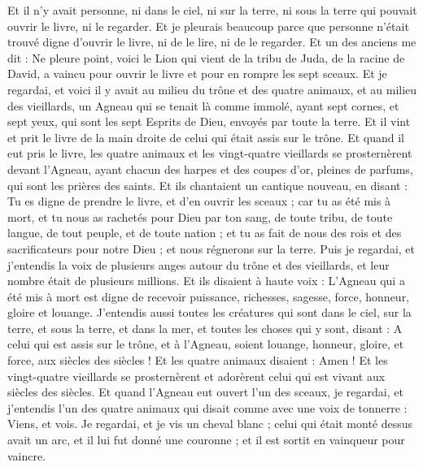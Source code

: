 \begin{multicols}{2}
Et il n'y avait personne, ni dans le ciel, ni sur la terre, ni sous la terre qui pouvait ouvrir le livre, ni le regarder.
Et je pleurais beaucoup parce que personne n'était trouvé digne d'ouvrir le livre, ni de le lire, ni de le regarder.
Et un des anciens me dit : Ne pleure point, voici le Lion qui vient de la tribu de Juda, de la racine de David, a vaincu pour ouvrir le livre et pour en rompre les sept sceaux.
Et je regardai, et voici il y avait au milieu du trône et des quatre animaux, et au milieu des vieillards, un Agneau qui se tenait là comme immolé, ayant sept cornes, et sept yeux, qui sont les sept Esprits de Dieu, envoyés par toute la terre.
Et il vint et prit le livre de la main droite de celui qui était assis sur le trône.
Et quand il eut pris le livre, les quatre animaux et les vingt-quatre vieillards se prosternèrent devant l'Agneau, ayant chacun des harpes et des coupes d'or, pleines de parfums, qui sont les prières des saints.
Et ils chantaient un cantique nouveau, en disant : Tu es digne de prendre le livre, et d'en ouvrir les sceaux ; car tu as été mis à mort, et tu nous as rachetés pour Dieu par ton sang, de toute tribu, de toute langue, de tout peuple, et de toute nation ;
et tu as fait de nous des rois et des sacrificateurs pour notre Dieu ; et nous régnerons sur la terre.
Puis je regardai, et j'entendis la voix de plusieurs anges autour du trône et des vieillards, et leur nombre était de plusieurs millions.
Et ils disaient à haute voix : L'Agneau qui a été mis à mort est digne de recevoir puissance, richesses, sagesse, force, honneur, gloire et louange.
J'entendis aussi toutes les créatures qui sont dans le ciel, sur la terre, et sous la terre, et dans la mer, et toutes les choses qui y sont, disant : A celui qui est assis sur le trône, et à l'Agneau, soient louange, honneur, gloire, et force, aux siècles des siècles !
Et les quatre animaux disaient : Amen ! Et les vingt-quatre vieillards se prosternèrent et adorèrent celui qui est vivant aux siècles des siècles.
\VerseOne{}Et quand l'Agneau eut ouvert l'un des sceaux, je regardai, et j'entendis l'un des quatre animaux qui disait comme avec une voix de tonnerre : Viens, et vois.
Je regardai, et je vis un cheval blanc ; celui qui était monté dessus avait un arc, et il lui fut donné une couronne ; et il est sortit en vainqueur pour vaincre.

\end{multicols}
